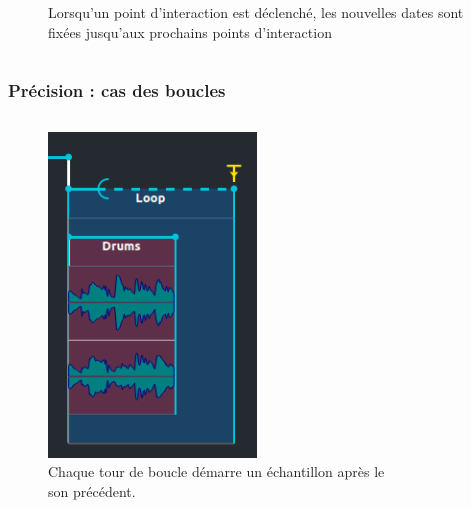\documentclass{beamer}
\begin{document}
\begin{frame}
\begin{columns}
\begin{column}{0.5\textwidth}
\begin{figure}
				\caption{Lorsqu'un point d'interaction est déclenché, les nouvelles dates sont fixées jusqu'aux prochains points d'interaction}
			\end{figure}
		\end{column}
	\end{columns}
\end{frame}  

\begin{frame}
	\frametitle{Précision : cas des boucles}
	\Large
	
	\begin{columns}
		\begin{column}{0.5\textwidth}
			\begin{figure}
				\centering
				\includegraphics[width=0.62\textwidth]{images/loop.png}
				\caption{Chaque tour de boucle démarre un échantillon après le son précédent.}
			\end{figure}
		\end{column}
		\begin{column}{0.5\textwidth}
			\begin{figure}
				\centering

\end{figure}
\end{column}
\end{columns}
\end{frame}
\end{document}
